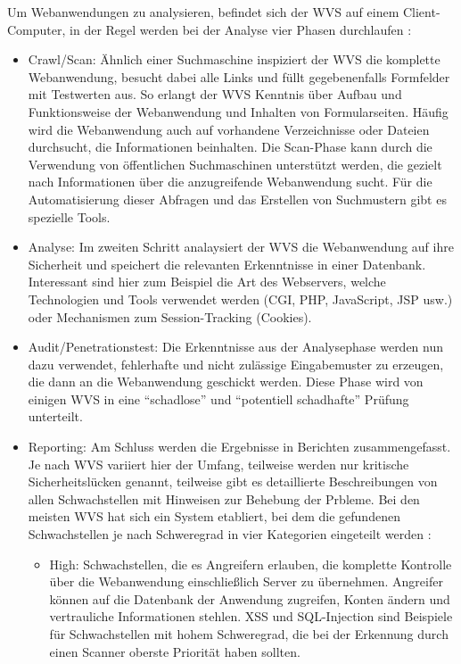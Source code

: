 \documentclass[12pt,oneside,a4paper,parskip,pointlessnumbers]{scrbook}
\begin{document}
  Um Webanwendungen zu analysieren, befindet sich der WVS  auf einem Client-Computer, in der Regel werden bei der Analyse vier Phasen durchlaufen \cite{BSI4}:
  \begin{itemize}
    \item Crawl/Scan:
    Ähnlich einer Suchmaschine inspiziert der WVS die komplette Webanwendung, besucht dabei alle Links und füllt gegebenenfalls Formfelder mit Testwerten aus. So erlangt der WVS Kenntnis über Aufbau und Funktionsweise der Webanwendung und Inhalten von Formularseiten.
    Häufig wird die Webanwendung auch auf vorhandene Verzeichnisse oder Dateien durchsucht, die Informationen beinhalten. Die Scan-Phase kann durch die Verwendung von öffentlichen Suchmaschinen unterstützt werden, die gezielt nach Informationen über die anzugreifende Webanwendung sucht.
    Für die Automatisierung dieser Abfragen und das Erstellen von Suchmustern gibt es spezielle Tools.
    \item Analyse:
    Im zweiten Schritt analaysiert der WVS die Webanwendung auf ihre Sicherheit und speichert die relevanten Erkenntnisse in einer Datenbank. Interessant sind hier zum Beispiel die Art des Webservers, welche Technologien und Tools verwendet werden (CGI, PHP, JavaScript, JSP usw.) oder Mechanismen zum Session-Tracking (Cookies).
    \item Audit/Penetrationstest:
    Die Erkenntnisse aus der Analysephase werden nun dazu verwendet, fehlerhafte und nicht zulässige Eingabemuster zu erzeugen, die dann an die Webanwendung geschickt werden. Diese Phase wird von einigen WVS in eine ``schadlose'' und ``potentiell schadhafte'' Prüfung unterteilt.
    \item Reporting:
    Am Schluss werden die Ergebnisse in Berichten zusammengefasst.
    Je nach WVS variiert hier der Umfang, teilweise werden nur kritische Sicherheitslücken genannt, teilweise gibt es detaillierte Beschreibungen von allen Schwachstellen mit Hinweisen zur Behebung der Prbleme.
    Bei den meisten WVS hat sich ein System etabliert, bei dem die gefundenen Schwachstellen je nach Schweregrad in vier Kategorien eingeteilt werden \cite{Lepofsky}:
    \begin{itemize}
      \item High: Schwachstellen, die es Angreifern erlauben, die komplette Kontrolle über die Webanwendung einschließlich Server zu übernehmen. Angreifer können auf die Datenbank der Anwendung zugreifen, Konten ändern und vertrauliche Informationen stehlen. XSS und SQL-Injection sind Beispiele für Schwachstellen mit hohem Schweregrad, die bei der Erkennung durch einen Scanner oberste Priorität haben sollten.


\end{itemize}
\end{itemize}
\end{document}

